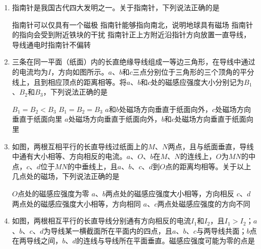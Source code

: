 \begin{enumerate}
\item
{}
指南针是我国古代四大发明之一。关于指南针，下列说法正确的是  

\fourchoices
{指南针可以仅具有一个磁极}
{指南针能够指向南北，说明地球具有磁场}
{指南针的指向会受到附近铁块的干扰}
{指南针正上方附近沿指针方向放置一直导线，导线通电时指南针不偏转}








\item
{}
三条在同一平面（纸面）内的长直绝缘导线组成一等边三角形，在导线中通过的电流均为$ I $，方向如图所示。$ a $、$ b $和$ c $三点分别位于三角形的三个顶角的平分线上，且到相应顶点的距离相等。将$ a $、$ b $和$ c $处的磁感应强度大小分别记为$ B_{1} $、$ B_{2} $和$ B_{3} $，下列说法正确的是  

\begin{figure}[h!]
\centering

\end{figure}


\fourchoices
{$ B_1=B_2<B_3 $}
{$ B_1=B_2=B_3 $}
{$ a $和$ b $处磁场方向垂直于纸面向外，$ c $处磁场方向垂直于纸面向里}
{$ a $处磁场方向垂直于纸面向外，$ b $和$ c $处磁场方向垂直于纸面向里}





\item
{}
如图，两根互相平行的长直导线过纸面上的$ M $、$ N $两点，且与纸面垂直，导线中通有大小相等、方向相反的电流。$ a $、$ O $、$ b $在$ M $、$ N $的连线上，$ O $为$ MN $的中点，$ c $、$ d $位于$ MN $的中垂线上，且$ a $、$ b $、$ c $、$ d $到$ O $点的距离均相等。关于以上几点处的磁场，下列说法正确的是  
\begin{figure}[h!]
\centering

\end{figure}


\fourchoices
{$ O $点处的磁感应强度为零}
{$ a $、$ b $两点处的磁感应强度大小相等，方向相反}
{$ c $、$ d $两点处的磁感应强度大小相等，方向相同}
{$ a $、$ c $两点处磁感应强度的方向不同}




\item
{}
如图，两根相互平行的长直导线分别通有方向相反的电流$ I_{1} $和$ I_{2} $，且$ I_1>I_2 $；$ a $、$ b $、$ c $、$ d $为导线某一横截面所在平面内的四点，且$ a $、$ b $、$ c $与两导线共面；$ b $点在两导线之间，$ b $、$ d $的连线与导线所在平面垂直。磁感应强度可能为零的点是  
\begin{figure}[h!]
\centering

\end{figure}


\end{enumerate}
